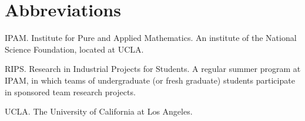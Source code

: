 \chapter{Abbreviations}\label{Abbreviations}

\noindent IPAM. Institute for Pure and Applied Mathematics.  An institute of the National Science  Foundation, located at UCLA.

\vspace{5pt}

\noindent RIPS.  Research in Industrial Projects for Students.  A regular summer program at IPAM, in which teams of undergraduate (or fresh graduate) students participate in sponsored team research projects.

\vspace{5pt}

\noindent UCLA.  The University of California at Los Angeles.

\vspace{5pt}




\endinput